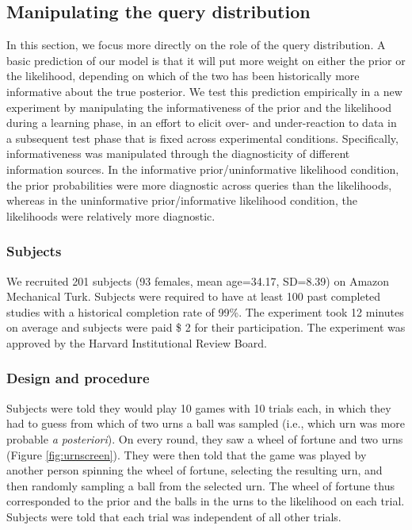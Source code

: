 \subsection{Manipulating the query distribution}

In this section, we focus more directly on the role of the query distribution. A basic prediction of our model is that it will put more weight on either the prior or the likelihood, depending on which of the two has been historically more informative about the true posterior. We test this prediction empirically in a new experiment by manipulating the informativeness of the prior and the likelihood during a learning phase, in an effort to elicit over- and under-reaction to data in a subsequent test phase that is fixed across experimental conditions. Specifically, informativeness was manipulated through the diagnosticity of different information sources. In the informative prior/uninformative likelihood condition, the prior probabilities were more diagnostic across queries than the likelihoods, whereas in the uninformative prior/informative likelihood condition, the likelihoods were relatively more diagnostic.

\subsubsection{Subjects}
We recruited 201 subjects (93 females, mean age=34.17, SD=8.39) on Amazon Mechanical Turk. Subjects were required to have at least 100 past completed studies with a historical completion rate of 99\%. The experiment took 12 minutes on average and subjects were paid \$ 2 for their participation. The experiment was approved by the Harvard Institutional Review Board.

\subsubsection{Design and procedure}
Subjects were told they would play 10 games with 10 trials each, in which they had to guess from which of two urns a ball was sampled (i.e., which urn was more probable \emph{a posteriori}). On every round, they saw a wheel of fortune and two urns (Figure \ref{fig:urnscreen}). They were then told that the game was played by another person spinning the wheel of fortune, selecting the resulting urn, and then randomly sampling a ball from the selected urn. The wheel of fortune thus corresponded to the prior and the balls in the urns to the likelihood on each trial. Subjects were told that each trial was independent of all other trials.

